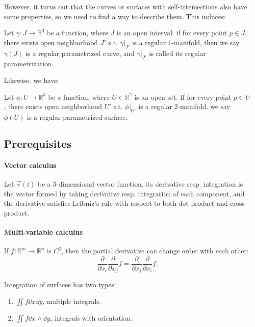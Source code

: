 However, it turns out that the curves or surfaces with self-intersections also have some
properties, so we need to find a way to describe them. This induces:

\begin{definition}
	Let $\gamma: J\to \mathbb{R}^3$ be a function, where $J$ is an open interval.
	if for every point $p\in J$, there exists open neighborhood  $J'$ s.t.
	$\gamma\big|_{J'}$ is a regular 1-manifold, then we say $\gamma(J)$
	is a regular parametrized curve, and  $\gamma\big|_{J'}$ is
	called its regular parametrization.
\end{definition}
Likewise, we have:
\begin{definition}
	Let $\phi:U\to \mathbb{R}^3$ be a function, where $U\in \mathbb{R}^2$ is an open set.
	If for every point $p\in U$, there exists open neighborhood  $U'$ s.t.
	$\phi\big|_{U'}$ is a regular 2-manifold, we say $\phi(U)$ is
	a regular parametrized surface.
\end{definition}

\subsection{Prerequisites}
\label{sub:Prerequisites}
\paragraph{Vector calculus}
Let $\vec{v}(t)$ be a 3-dimensional vector function,
its derivative resp. integration is the vector formed by taking
derivative resp. integration of each component,
and the derivative satisfies Leibniz's rule with respect to both dot product
and cross product.

\paragraph{Multi-variable calculus}
If $f: \mathbb{R}^m\to \mathbb{R}^n$ is $C^2$, then the partial derivative
can change order with each other:
 \[
	\frac{\partial}{\partial x_i} \frac{\partial}{\partial x_j} f =
	\frac{\partial}{\partial x_j} \frac{\partial}{\partial x_i} f.
\]

Integration of surfaces has two types:
\begin{enumerate}
	\item $\iint f \dd x\dd y$, multiple integrals.
	\item $\iint f \dd x\wedge \dd y$, integrals with orientation.
\end{enumerate}
